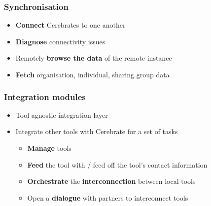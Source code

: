 \begin{frame}
	\frametitle{Synchronisation}
	\begin{itemize}
                \item {\bf Connect} Cerebrates to one another
                \item {\bf Diagnose} connectivity issues
                \item Remotely {\bf browse the data} of the remote instance
                \item {\bf Fetch} organisation, individual, sharing group data
	\end{itemize}
\end{frame}

\begin{frame}
	\frametitle{Integration modules}
	\begin{itemize}
                \item Tool agnostic integration layer
                \item Integrate other tools with Cerebrate for a set of tasks
         	\begin{itemize}
		        \item {\bf Manage} tools
		        \item {\bf Feed} the tool with / feed off the tool's contact information
                        \item {\bf Orchestrate} the {\bf interconnection} between local tools
                        \item Open a {\bf dialogue} with partners to interconnect tools
		\end{itemize}
	\end{itemize}
\end{frame}

